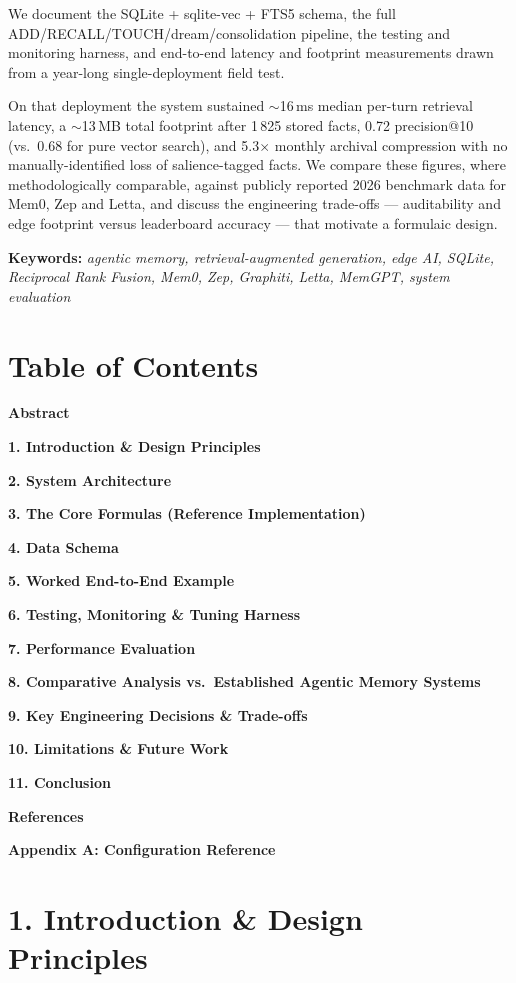 \documentclass[]{article}
\begin{document}
We document the SQLite + sqlite-vec + FTS5 schema, the full
ADD/RECALL/TOUCH/dream/consolidation pipeline, the testing and monitoring
harness, and end-to-end latency and footprint measurements drawn from a
year-long single-deployment field test.

On that deployment the system sustained \(\sim\)16\,ms median per-turn
retrieval latency, a \(\sim\)13\,MB total footprint after 1\,825 stored
facts, 0.72 precision@10 (vs.\ 0.68 for pure vector search), and 5.3\(\times\)
monthly archival compression with no manually-identified loss of
salience-tagged facts. We compare these figures, where methodologically
comparable, against publicly reported 2026 benchmark data for Mem0, Zep
and Letta, and discuss the engineering trade-offs --- auditability and
edge footprint versus leaderboard accuracy --- that motivate a formulaic
design.

\textbf{Keywords:} \emph{agentic memory, retrieval-augmented generation,
edge AI, SQLite, Reciprocal Rank Fusion, Mem0, Zep, Graphiti, Letta,
MemGPT, system evaluation}

\hypertarget{table-of-contents}{%
\section{\texorpdfstring{\textbf{Table of
Contents}}{Table of Contents}}\label{table-of-contents}}

\textbf{Abstract}

\textbf{1. Introduction \& Design Principles}

\textbf{2. System Architecture}

\textbf{3. The Core Formulas (Reference Implementation)}

\textbf{4. Data Schema}

\textbf{5. Worked End-to-End Example}

\textbf{6. Testing, Monitoring \& Tuning Harness}

\textbf{7. Performance Evaluation}

\textbf{8. Comparative Analysis vs.\ Established Agentic Memory Systems}

\textbf{9. Key Engineering Decisions \& Trade-offs}

\textbf{10. Limitations \& Future Work}

\textbf{11. Conclusion}

\textbf{References}

\textbf{Appendix A: Configuration Reference}

\hypertarget{introduction-design-principles}{%
\section{\texorpdfstring{\textbf{1. Introduction \& Design
Principles}}{1. Introduction \& Design Principles}}\label{introduction-design-principles}}
\end{document}
